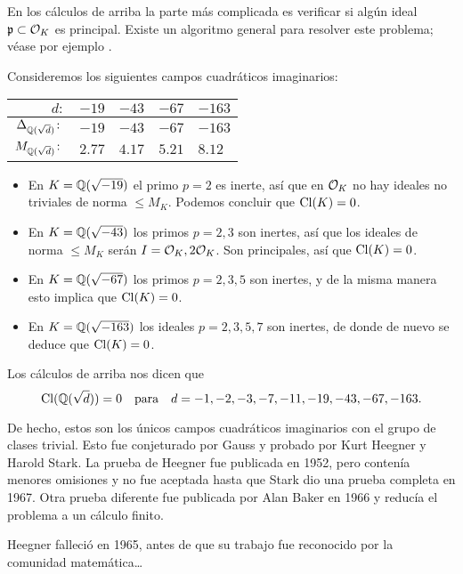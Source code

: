 En los cálculos de arriba la parte más complicada es verificar si algún ideal
$\mathfrak{p} \subset \mathcal{O}_K$ es principal. Existe un algoritmo general para
resolver este problema; véase por ejemplo \cite{Buchmann-Williams-1987}.

\begin{ejemplo}
  Consideremos los siguientes campos cuadráticos imaginarios:

  \begin{center}\renewcommand{\arraystretch}{1.5}
    \begin{tabular}{rx{2cm}x{2cm}x{2cm}x{2cm}}
      \hline
      $d\colon$ & $-19$ & $-43$ & $-67$ & $-163$ \tabularnewline
      \hline
      $\Delta_{\mathbb{Q} (\sqrt{d})}\colon$ & $-19$ & $-43$ & $-67$ & $-163$ \tabularnewline
      \hline
      $M_{\mathbb{Q} (\sqrt{d})}\colon$ & $2.77$ & $4.17$ & $5.21$ & $8.12$ \tabularnewline
      \hline
    \end{tabular}
  \end{center}

  \begin{itemize}
  \item En $K = \mathbb{Q} (\sqrt{-19})$ el primo $p = 2$ es inerte, así que en $\mathcal{O}_K$
    no hay ideales no triviales de norma $\le M_K$. Podemos concluir que
    $\operatorname{Cl} (K) = 0$.

  \item En $K = \mathbb{Q} (\sqrt{-43})$ los primos $p = 2, 3$ son inertes, así que los
    ideales de norma $\le M_K$ serán $I = \mathcal{O}_K, 2\mathcal{O}_K$. Son principales, así que
    $\operatorname{Cl} (K) = 0$.

  \item En $K = \mathbb{Q} (\sqrt{-67})$ los primos $p = 2,3,5$ son inertes, y de la
    misma manera esto implica que $\operatorname{Cl} (K) = 0$.

  \item En $K = \mathbb{Q} (\sqrt{-163})$ los ideales $p = 2,3,5,7$ son inertes,
    de donde de nuevo se deduce que $\operatorname{Cl} (K) = 0$. \qedhere
  \end{itemize}
\end{ejemplo}

\begin{comentario}
  Los cálculos de arriba nos dicen que
  \[ \operatorname{Cl} (\mathbb{Q} (\sqrt{d})) = 0
     \quad\text{para}\quad
     d = -1, -2, -3, -7, -11, -19, -43, -67, -163.\]

  De hecho, estos son los únicos campos cuadráticos imaginarios con el grupo de
  clases trivial. Esto fue conjeturado por Gauss y probado por Kurt Heegner y
  Harold Stark. La prueba de Heegner fue publicada en 1952, pero contenía
  menores omisiones y no fue aceptada hasta que Stark dio una prueba completa en
  1967. Otra prueba diferente fue publicada por Alan Baker en 1966 y reducía el
  problema a un cálculo finito.

  Heegner falleció en 1965, antes de que su trabajo fue reconocido por
  la comunidad matemática\dots
\end{comentario}

